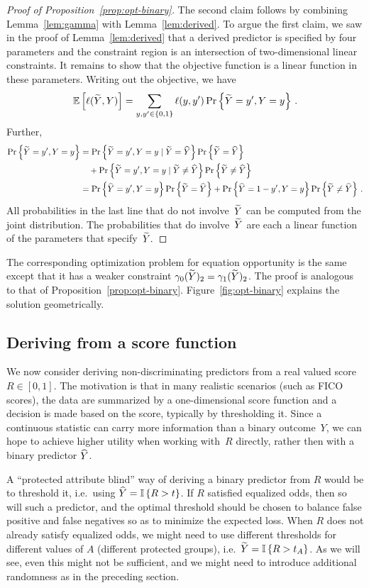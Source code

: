 \begin{proof}[Proof of Proposition~\ref{prop:opt-binary}]
The second claim follows by combining Lemma~\ref{lem:gamma} with
Lemma~\ref{lem:derived}. To argue the first claim, we saw
in the proof of Lemma~\ref{lem:derived} that a derived
predictor is specified by four parameters and the constraint region is an
intersection of two-dimensional linear constraints.
%
It remains to show that the objective function is a linear function in these
parameters. Writing out the objective, we have
\[
\mathbb{E}\left[\ell(\widetilde{Y}, Y)\right]
= \sum_{y,y'\in\{0,1\}} \ell(y,y')\Pr\left\{\widetilde{Y}=y',Y=y\right\}\,.
\]
Further,
\begin{align*}
\Pr\left\{\widetilde{Y}=y',Y=y\right\}
& = \Pr\left\{\widetilde{Y}=y',Y=y\mid \widetilde{Y}=\widehat{Y}\right\}\Pr\left\{\widetilde{Y}=\widehat{Y}\right\}\\
& \quad + \Pr\left\{\widetilde{Y}=y',Y=y\mid \widetilde{Y}\neq\widehat{Y}\right\}\Pr\left\{\widetilde{Y}\neq\widehat{Y}\right\}\\
& = \Pr\left\{\widehat{Y}=y',Y=y\right\}\Pr\left\{\widetilde{Y}=\widehat{Y}\right\}
+ \Pr\left\{\widehat{Y}=1-y',Y=y\right\}\Pr\left\{\widetilde{Y}\neq\widehat{Y}\right\}\,.
\end{align*}
All probabilities in the last line that do not involve~$\widetilde{Y}$ can be computed
from the joint distribution. The probabilities that do involve~$\widetilde{Y}$ are each
a linear function of the parameters that specify~$\widetilde{Y}.$
\end{proof}
%
The corresponding optimization problem for equation opportunity is the same
except that it has a weaker constraint $\gamma_0(\widetilde{Y})_2 =
\gamma_1(\widetilde{Y})_2$.
The proof is analogous to that of Proposition~\ref{prop:opt-binary}.
Figure~\ref{fig:opt-binary} explains the solution geometrically.

\subsection{Deriving from a score function}
\label{sec:opt-thresholds}

We now consider deriving non-discriminating predictors from a real
valued score~$R\in[0,1]$.  The motivation is that in many realistic
scenarios (such as FICO scores), the data are summarized by a
one-dimensional score function and a decision is made based on the
score, typically by thresholding it. Since a continuous statistic can
carry more information than a binary outcome~$Y$, we can hope to
achieve higher utility when working with~$R$ directly, rather then
with a binary predictor $\widehat{Y}$.

A ``protected attribute blind'' way of deriving a binary predictor
from $R$ would be to threshold it, i.e.~using $\widehat{Y}=\mathbb{I}\left\{R>t\right\}$.
If $R$ satisfied equalized odds, then so will such a predictor, and
the optimal threshold should be chosen to balance false positive and
false negatives so as to minimize the expected loss.  When $R$ does
not already satisfy equalized odds, we might need to use different
thresholds for different values of $A$ (different protected groups),
i.e.~$\widetilde{Y}=\mathbb{I}\left\{R>t_A\right\}$.  As we will see, even this might not
be sufficient, and we might need to introduce additional randomness as
in the preceding section.

